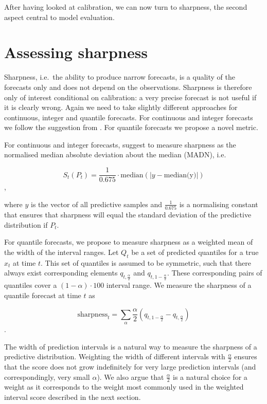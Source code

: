 \documentclass[
]{book}
\begin{document}
After having looked at calibration, we can now turn to sharpness, the second aspect central to model evaluation.

\hypertarget{assessing-sharpness}{%
\section{Assessing sharpness}\label{assessing-sharpness}}

Sharpness, i.e.~the ability to produce narrow forecasts, is a quality of the forecasts only and does not depend on the observations. Sharpness is therefore only of interest conditional on calibration: a very precise forecast is not useful if it is clearly wrong. Again we need to take slightly different approaches for continuous, integer and quantile forecasts. For continuous and integer forecasts we follow the suggestion from \citet{funkAssessingPerformanceRealtime2019}. For quantile forecasts we propose a novel metric.

For continuous and integer forecasts, \citet{funkAssessingPerformanceRealtime2019} suggest to measure sharpness as the normalised median absolute deviation about the median (MADN), i.e.~

\[ S_t(P_t) = \frac{1}{0.675} \cdot \text{median}(|y - \text{median(y)}|) \],

where \(y\) is the vector of all predictive samples and \(\frac{1}{0.675}\) is a normalising constant that ensures that sharpness will equal the standard deviation of the predictive distribution if \(P_t\).

For quantile forecasts, we propose to measure sharpness as a weighted mean of the width of the interval ranges. Let \(Q_t\) be a set of predicted quantiles for a true \(x_t\) at time \(t\). This set of quantiles is assumed to be symmetric, such that there always exist corresponding elements \(q_{t, \frac{\alpha}{2}}\) and \(q_{t, 1-\frac{\alpha}{2}}\). These corresponding pairs of quantiles cover a \((1 - \alpha) \cdot 100\) interval range. We measure the sharpness of a quantile forecast at time \(t\) as

\[\text{sharpness}_t = \sum_{\alpha} \frac{\alpha}{2} (q_{t, 1 - \frac{\alpha}{2}} - q_{t, \frac{\alpha}{2}}) \].

The width of prediction intervals is a natural way to measure the sharpness of a predictive distribution. Weighting the width of different intervals with \(\frac{\alpha}{2}\) ensures that the score does not grow indefinitely for very large prediction intervals (and correspondingly, very small \(\alpha\)). We also argue that \(\frac{\alpha}{2}\) is a natural choice for a weight as it corresponds to the weight most commonly used in the weighted interval score described in the next section.
\end{document}
